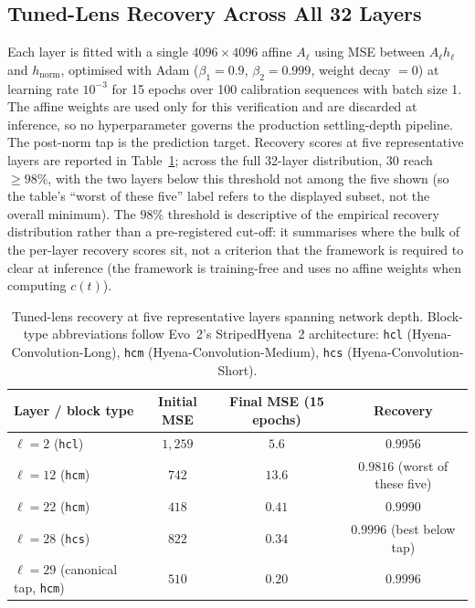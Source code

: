 \documentclass{article}
\theoremstyle{plain}
\theoremstyle{definition}
\theoremstyle{remark}
\newcommand{\hnorm}{h_{\mathrm{norm}}}
\begin{document}
\subsection{Tuned-Lens Recovery Across All 32 Layers}
\label{app:tuned-lens}

Each layer is fitted with a single $4096 \times 4096$ affine $A_{\ell}$
using MSE between $A_{\ell} h_{\ell}$ and $\hnorm$, optimised with Adam
($\beta_1 = 0.9$, $\beta_2 = 0.999$, weight decay $= 0$) at learning
rate $10^{-3}$ for 15 epochs over 100 calibration sequences with batch
size 1. The affine weights are used only for this verification and are
discarded at inference, so no hyperparameter governs the production
settling-depth pipeline. The
post-norm tap is the prediction target. Recovery scores at five
representative layers are reported in Table~\ref{tab:tuned-lens};
across the full 32-layer distribution, $30$ reach $\ge 98\%$, with the
two layers below this threshold not among the five shown (so the
table's ``worst of these five'' label refers to the displayed subset,
not the overall minimum). The $98\%$ threshold is descriptive of
the empirical recovery distribution rather than a pre-registered
cut-off: it summarises where the bulk of the per-layer recovery scores
sit, not a criterion that the framework is required to clear at
inference (the framework is training-free and uses no affine weights
when computing $c(t)$).

\begin{table}[!htbp]
  \caption{Tuned-lens recovery at five representative layers spanning
  network depth. Block-type abbreviations follow Evo~2's StripedHyena~2
  architecture: \texttt{hcl} (Hyena-Convolution-Long), \texttt{hcm}
  (Hyena-Convolution-Medium), \texttt{hcs} (Hyena-Convolution-Short).}
  \label{tab:tuned-lens}
  \centering
  \small
  \begin{tabular}{@{}lccc@{}}
    \toprule
    Layer / block type & Initial MSE & Final MSE (15 epochs) & Recovery \\
    \midrule
    $\ell=2$ (\texttt{hcl}) & $1{,}259$ & $5.6$ & $0.9956$ \\
    $\ell=12$ (\texttt{hcm}) & $742$ & $13.6$ & $0.9816$ (worst of these five) \\
    $\ell=22$ (\texttt{hcm}) & $418$ & $0.41$ & $0.9990$ \\
    $\ell=28$ (\texttt{hcs}) & $822$ & $0.34$ & $0.9996$ (best below tap) \\
    $\ell=29$ (canonical tap, \texttt{hcm}) & $510$ & $0.20$ & $0.9996$ \\
    \bottomrule
  \end{tabular}
\end{table}
\end{document}

